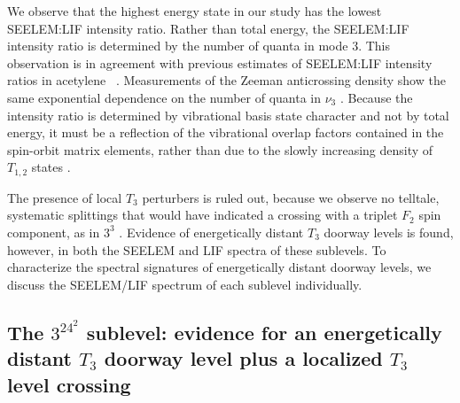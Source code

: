 We observe that the highest energy state in our study has the lowest
SEELEM:LIF intensity ratio.  Rather than total energy, the SEELEM:LIF
intensity ratio is determined by the number of quanta in mode 3.  This
observation is in agreement with previous estimates of SEELEM:LIF
intensity ratios in acetylene \astate\ \cite{humphrey97}.
Measurements of the Zeeman anticrossing density show the same
exponential dependence on the number of quanta in $\nu_3$
\cite{dupre91}.  Because the intensity ratio is determined by
vibrational basis state character and not by total energy, it must be
a reflection of the vibrational overlap factors contained in the
spin-orbit matrix elements, rather than due to the slowly increasing
density of $T_{1,2}$ states \cite{dupre91, dupre95b}.

The presence of local $T_3$ perturbers is ruled out, because we
observe no telltale, systematic splittings that would have indicated a
crossing with a triplet $F_2$ spin component, as in $3^3$ 
\cite{mishra04}.  Evidence of energetically distant $T_3$ doorway
levels is found, however, in both the SEELEM and LIF spectra of these
sublevels.  To characterize the spectral signatures of energetically
distant doorway levels, we discuss the SEELEM/LIF spectrum of each
sublevel individually.


\subsection{The $3^24^2$  sublevel: evidence for an
  energetically distant $T_3$ doorway level plus a localized $T_3$
  level crossing}




